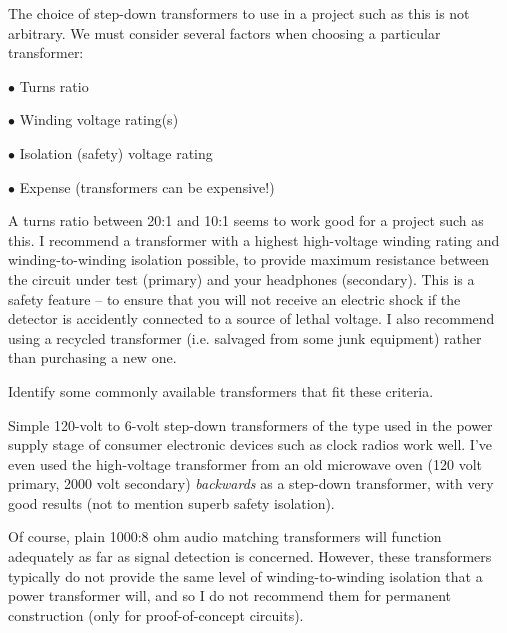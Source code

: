 

The choice of step-down transformers to use in a project such as this is not arbitrary.  We must consider several factors when choosing a particular transformer:

\medskip
\item{$\bullet$} Turns ratio
\item{$\bullet$} Winding voltage rating(s)
\item{$\bullet$} Isolation (safety) voltage rating
\item{$\bullet$} Expense (transformers can be expensive!)
\medskip

A turns ratio between 20:1 and 10:1 seems to work good for a project such as this.  I recommend a transformer with a highest high-voltage winding rating and winding-to-winding isolation possible, to provide maximum resistance between the circuit under test (primary) and your headphones (secondary).  This is a safety feature -- to ensure that you will not receive an electric shock if the detector is accidently connected to a source of lethal voltage.  I also recommend using a recycled transformer (i.e. salvaged from some junk equipment) rather than purchasing a new one.

Identify some commonly available transformers that fit these criteria.







Simple 120-volt to 6-volt step-down transformers of the type used in the power supply stage of consumer electronic devices such as clock radios work well.  I've even used the high-voltage transformer from an old microwave oven (120 volt primary, 2000 volt secondary) {\it backwards} as a step-down transformer, with very good results (not to mention superb safety isolation).  

Of course, plain 1000:8 ohm audio matching transformers will function adequately as far as signal detection is concerned.  However, these transformers typically do not provide the same level of winding-to-winding isolation that a power transformer will, and so I do not recommend them for permanent construction (only for proof-of-concept circuits).

